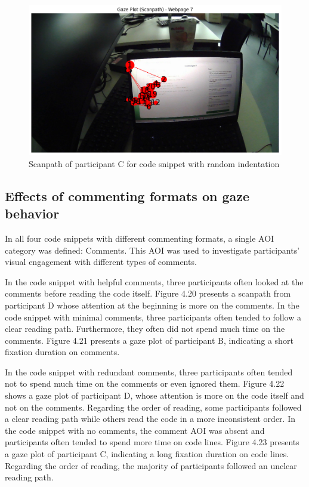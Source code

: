  



\begin{figure} [H]
  \centering
  \includegraphics[scale=0.6]{figures/r-ind.png}
  \caption{Scanpath of  participant C for code snippet with random indentation}
  \label{fig:AnhangsChor}
\end{figure}



\subsection{Effects of commenting formats on gaze behavior}

In all four code snippets with different commenting formats, a single AOI category was defined: Comments. This AOI was used to investigate participants’ visual engagement with different types of comments. 

In the code snippet with helpful comments, three participants often looked at the comments before reading the code itself.  Figure 4.20 presents a scanpath from participant D whose attention at the beginning is more on the comments. In the code snippet with minimal comments, three participants often tended to follow a clear reading path.  Furthermore, they often did not spend much time on the comments. Figure 4.21  presents a gaze plot of participant B, indicating a short fixation duration on comments. 


In the code snippet with redundant comments, three participants often tended not to spend much time on the comments or even ignored them. Figure 4.22  shows a gaze plot of participant D, whose attention  is more on the code itself and not on the comments. Regarding the order of reading, some participants followed a clear reading path while others read the code in a more inconsistent order.  In the code snippet with no comments, the comment AOI was absent and participants often tended to spend more time on code lines. Figure 4.23 presents a gaze plot of participant C, indicating a long fixation duration on code lines.    Regarding the order of reading, the majority of participants followed an unclear reading path.


